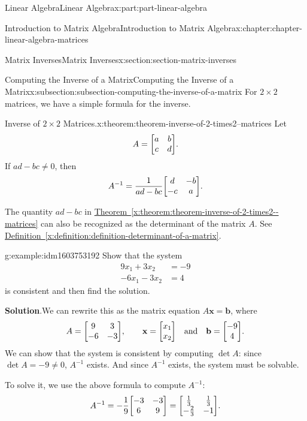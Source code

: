 \documentclass[twoside,10pt,]{book}
\newcommand{\blocktitlefont}{\relax}
\newcommand{\xreffont}{\relax}
\numberwithin{equation}{part}
\providecommand{\vb}[1]{\mathbf{#1}}
\begin{document}
\begin{partptx}{Linear Algebra}{}{Linear Algebra}{}{}{x:part:part-linear-algebra}
\begin{chapterptx}{Introduction to Matrix Algebra}{}{Introduction to Matrix Algebra}{}{}{x:chapter:chapter-linear-algebra-matrices}
\begin{sectionptx}{Matrix Inverses}{}{Matrix Inverses}{}{}{x:section:section-matrix-inverses}
\typeout{************************************************}
%
\begin{subsectionptx}{Computing the Inverse of a Matrix}{}{Computing the Inverse of a Matrix}{}{}{x:subsection:subsection-computing-the-inverse-of-a-matrix}
For \(2\times 2\) matrices, we have a simple formula for the inverse.%
\begin{theorem}{Inverse of \(2\times2\) Matrices.}{}{x:theorem:theorem-inverse-of-2-times2--matrices}%
Let%
\begin{equation*}
A = \mqty[a & b \\ c & d].
\end{equation*}
If \(ad-bc\neq0\), then%
\begin{equation*}
A^{-1} = \frac{1}{ad-bc}\mqty[d & -b \\ -c & a].
\end{equation*}
%
\end{theorem}
The quantity \(ad-bc\) in \hyperref[x:theorem:theorem-inverse-of-2-times2--matrices]{Theorem~{\xreffont\ref{x:theorem:theorem-inverse-of-2-times2--matrices}}} can also be recognized as the determinant of the matrix \(A\). See \hyperref[x:definition:definition-determinant-of-a-matrix]{Definition~{\xreffont\ref{x:definition:definition-determinant-of-a-matrix}}}.%
\begin{example}{}{g:example:idm1603753192}%
Show that the system%
\begin{align*}
9x_{1}+3x_{2} &= -9\\
-6x_{1}-3x_{2} &= 4
\end{align*}
is consistent and then find the solution.%
\par\smallskip%
\noindent\textbf{\blocktitlefont Solution}.\hypertarget{g:solution:idm1603756392}{}\quad{}We can rewrite this as the matrix equation \(A\vb{x} = \vb{b}\), where%
\begin{equation*}
A = \mqty[9 & 3 \\ -6 & -3],\qq{}\vb{x} = \mqty[x_{1} \\ x_{2}]\qq{and} \vb{b} = \mqty[-9 \\ 4].
\end{equation*}
We can show that the system is consistent by computing \(\det A\): since \(\det A = -9\neq0\), \(A^{-1}\) exists. And since \(A^{-1}\) exists, the system must be solvable.%
\par
To solve it, we use the above formula to compute \(A^{-1}\):%
\begin{equation*}
A^{-1} = -\frac{1}{9}\mqty[-3 & -3 \\ 6 & 9] = \mqty[\frac{1}{3} & \frac{1}{3} \\ -\frac{2}{3} & -1 ].

\end{equation*}
\end{example}
\end{subsectionptx}
\end{sectionptx}
\end{chapterptx}
\end{partptx}
\end{document}
